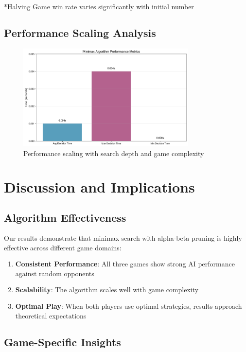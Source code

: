 \documentclass[12pt]{article}
\begin{document}
*Halving Game win rate varies significantly with initial number

\subsection{Performance Scaling Analysis}

\begin{figure}[H]
\centering
\includegraphics[width=0.8\textwidth]{output/performance_metrics.png}
\caption{Performance scaling with search depth and game complexity}
\label{fig:performance_scaling}
\end{figure}

\section{Discussion and Implications}

\subsection{Algorithm Effectiveness}

Our results demonstrate that minimax search with alpha-beta pruning is highly effective across different game domains:

\begin{enumerate}
    \item \textbf{Consistent Performance}: All three games show strong AI performance against random opponents
    \item \textbf{Scalability}: The algorithm scales well with game complexity
    \item \textbf{Optimal Play}: When both players use optimal strategies, results approach theoretical expectations
\end{enumerate}

\subsection{Game-Specific Insights}
\end{document}
